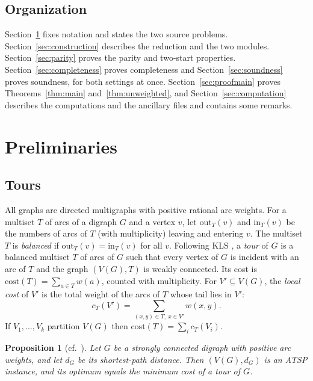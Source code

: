 \documentclass[11pt]{amsart}
\newtheorem{proposition}[theorem]{Proposition}
\theoremstyle{definition}
\theoremstyle{remark}
\numberwithin{equation}{section}
\newcommand{\cost}{\mathrm{cost}}
\begin{document}
\subsection*{Organization}
Section~\ref{sec:prelim} fixes notation and states the two source problems. Section~\ref{sec:construction} describes the reduction and the two modules. Section~\ref{sec:parity} proves the parity and two-start properties. Section~\ref{sec:completeness} proves completeness and Section~\ref{sec:soundness} proves soundness, for both settings at once. Section~\ref{sec:proofmain} proves Theorems~\ref{thm:main} and~\ref{thm:unweighted}, and Section~\ref{sec:computation} describes the computations and the ancillary files and contains some remarks.

\section{Preliminaries}\label{sec:prelim}

\subsection{Tours}
All graphs are directed multigraphs with positive rational arc weights. For a multiset $T$ of arcs of a digraph $G$ and a vertex $v$, let $\mathrm{out}_T(v)$ and $\mathrm{in}_T(v)$ be the numbers of arcs of $T$ (with multiplicity) leaving and entering $v$. The multiset $T$ is \emph{balanced} if $\mathrm{out}_T(v)=\mathrm{in}_T(v)$ for all $v$. Following KLS \cite[\S2]{KLS15}, a \emph{tour} of $G$ is a balanced multiset $T$ of arcs of $G$ such that every vertex of $G$ is incident with an arc of $T$ and the graph $(V(G),T)$ is weakly connected. Its cost is $\cost(T)=\sum_{a\in T}w(a)$, counted with multiplicity. For $V'\subseteq V(G)$, the \emph{local cost} of $V'$ is the total weight of the arcs of $T$ whose tail lies in $V'$:
\[
c_T(V')=\sum_{(x,y)\in T,\ x\in V'}w(x,y).
\]
If $V_1,\dots,V_k$ partition $V(G)$ then $\cost(T)=\sum_i c_T(V_i)$.

\begin{proposition}[{cf.\ \cite[\S2]{KLS15}}]\label{prop:tours}
Let $G$ be a strongly connected digraph with positive arc weights, and let $d_G$ be its shortest-path distance. Then $(V(G),d_G)$ is an ATSP instance, and its optimum equals the minimum cost of a tour of $G$.
\end{proposition}
\end{document}
